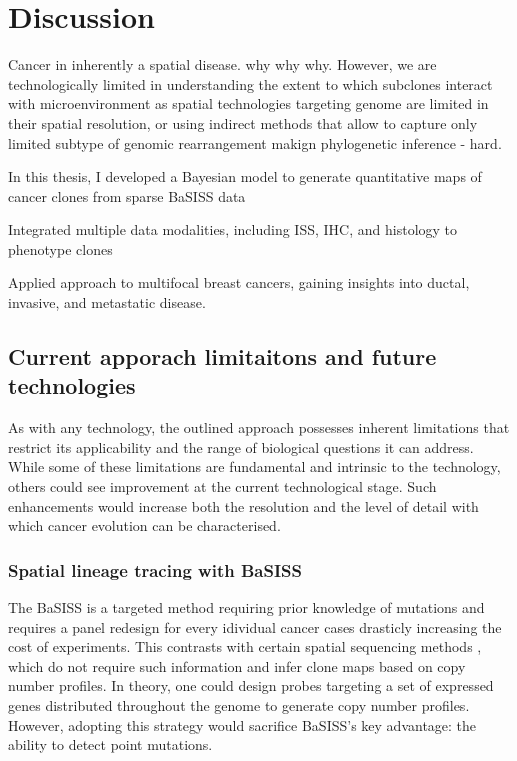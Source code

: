 \chapter{Discussion}
\label{sec:chapter-discussion}

Cancer in inherently a spatial disease. why why why. However, we are technologically limited in understanding the extent to which subclones interact with microenvironment as spatial technologies targeting genome are limited in their spatial resolution, or using indirect methods that allow to capture only limited subtype of genomic rearrangement makign phylogenetic inference - hard.

In this thesis, I developed a Bayesian model to generate quantitative maps of cancer clones from sparse BaSISS data

Integrated multiple data modalities, including ISS, IHC, and histology to phenotype clones

Applied approach to multifocal breast cancers, gaining insights into ductal, invasive, and metastatic disease.

\section{Current apporach limitaitons and future technologies}

As with any technology, the outlined approach possesses inherent limitations that restrict its applicability and the range of biological questions it can address. While some of these limitations are fundamental and intrinsic to the technology, others could see improvement at the current technological stage. Such enhancements would increase both the resolution and the level of detail with which cancer evolution can be characterised.

\subsection{Spatial lineage tracing with \ac{BaSISS}}

The \ac{BaSISS} is a targeted method requiring prior knowledge of mutations and requires a panel redesign for every idividual cancer cases drasticly increasing the cost of experiments. This contrasts with certain spatial sequencing methods \parencite{Zhao2022-xd,Erickson2022-zh}, which do not require such information and infer clone maps based on copy number profiles. In theory, one could design probes targeting a set of expressed genes distributed throughout the genome to generate copy number profiles. However, adopting this strategy would sacrifice \ac{BaSISS}'s key advantage: the ability to detect point mutations.

